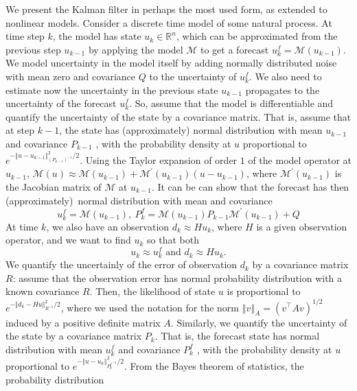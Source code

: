 \documentclass[12pt]{article}%
\begin{document}
We present the Kalman filter in perhaps the most used form, as extended to nonlinear models.
 Consider a discrete time model of some natural
process. At time step $k$, the model has state $u_{k}\in\mathbb{R}^{n}$, which
can be approximated from the previous step $u_{k-1}$ by applying the model
$\mathcal{M}$ to get a forecast $u_{k}^{f}=\mathcal{M}\left(  u_{k-1}\right)
$. We model uncertainty in the model itself by adding normally distributed
noise with mean zero and covariance $Q$ to the uncertainty of $u_{k}^{f}$. We
also need to estimate now the uncertainty in the previous state $u_{k-1}$
propagates to the uncertainty of the forecast $u_{k}^{f}$. So, assume that the
model is differentiable and quantify the uncertainty of the state by a
covariance matrix. That is,  assume that at step $k-1$, the state has
(approximately) normal distribution with mean $u_{k-1}$ and covariance
$P_{k-1}$ , with the probability density at $u$ proportional to
$e^{-\left\Vert u-u_{k-1}\right\Vert _{\left(  P_{k-1}^{{}}\right)  ^{-1}}%
^{2}/2}$. Using the Taylor expansion of order $1$ of the model operator at
$u_{k-1}$, $\mathcal{M}\left(  u\right)  \approx\mathcal{M}\left(
u_{k-1}\right)  +\mathcal{M}^{\prime}\left(  u_{k-1}\right)  \left(
u-u_{k-1}\right)  $, where $\mathcal{M}^{\prime}\left(  u_{k-1}\right)  $ is
the Jacobian matrix of $\mathcal{M}$ at $u_{k-1}$. It can be can show that the
forecast has then (approximately)\ normal distribution with mean and
covariance
$$
u_{k}^{f}=\mathcal{M}\left(  u_{k-1}\right)  ,\ P_{k}^{f}=\mathcal{M}\left(
u_{k-1}\right)  P_{k-1}\mathcal{M}^{\prime}\left(  u_{k-1}\right)  +Q
$$
At time $k$, we also have an observation $d_{k}\approx Hu_{k}$, where $H$ is a
given observation operator, and we want to find $u_{k}$ so that both
$$
u_{k}\approx u_{k}^{f}\text{ and }d_{k}\approx Hu_{k}.
$$
We quantify the uncertainly of the error of observation $d_{k}$ by a covariance
matrix $R$: assume that the observation error has normal probability
distribution with a known covariance $R$. Then, the likelihood of state $u$ is
proportional to $e^{-\left\Vert d_{k}-Hu\right\Vert _{R^{-1}}^{2}/2}$, where
we used the notation for the norm $\left\Vert v\right\Vert _{A}%
=\left(v^{\top}Av\right)^{1/2}$ induced by a positive definite matrix $A$. Similarly, we quantify the
uncertainty of the state by a covariance matrix $P_{k}$. That is, the forecast
state has normal distribution with mean $u_{k}^{f}$  and covariance
$P_{k}^{f}$ , with the probability density at $u$ proportional to
$e^{-\left\Vert u-u_{k}\right\Vert _{{P_{k}^{f}}^{-1}}^{2}/2}$. From the Bayes theorem of statistics, the probability distribution
\end{document}
